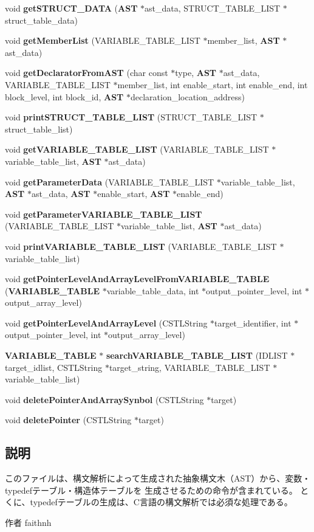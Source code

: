 \begin{DoxyCompactItemize}
void {\bf getSTRUCT\_\-DATA} ({\bf AST} $\ast$ast\_\-data, STRUCT\_\-TABLE\_\-LIST $\ast$struct\_\-table\_\-data)
\item 
void {\bf getMemberList} (VARIABLE\_\-TABLE\_\-LIST $\ast$member\_\-list, {\bf AST} $\ast$ast\_\-data)
\item 
void {\bf getDeclaratorFromAST} (char const $\ast$type, {\bf AST} $\ast$ast\_\-data, VARIABLE\_\-TABLE\_\-LIST $\ast$member\_\-list, int enable\_\-start, int enable\_\-end, int block\_\-level, int block\_\-id, {\bf AST} $\ast$declaration\_\-location\_\-address)
\item 
void {\bf printSTRUCT\_\-TABLE\_\-LIST} (STRUCT\_\-TABLE\_\-LIST $\ast$struct\_\-table\_\-list)
\item 
void {\bf getVARIABLE\_\-TABLE\_\-LIST} (VARIABLE\_\-TABLE\_\-LIST $\ast$variable\_\-table\_\-list, {\bf AST} $\ast$ast\_\-data)
\item 
void {\bf getParameterData} (VARIABLE\_\-TABLE\_\-LIST $\ast$variable\_\-table\_\-list, {\bf AST} $\ast$ast\_\-data, {\bf AST} $\ast$enable\_\-start, {\bf AST} $\ast$enable\_\-end)
\item 
void {\bf getParameterVARIABLE\_\-TABLE\_\-LIST} (VARIABLE\_\-TABLE\_\-LIST $\ast$variable\_\-table\_\-list, {\bf AST} $\ast$ast\_\-data)
\item 
void {\bf printVARIABLE\_\-TABLE\_\-LIST} (VARIABLE\_\-TABLE\_\-LIST $\ast$variable\_\-table\_\-list)
\item 
void {\bf getPointerLevelAndArrayLevelFromVARIABLE\_\-TABLE} ({\bf VARIABLE\_\-TABLE} $\ast$variable\_\-table\_\-data, int $\ast$output\_\-pointer\_\-level, int $\ast$output\_\-array\_\-level)
\item 
void {\bf getPointerLevelAndArrayLevel} (CSTLString $\ast$target\_\-identifier, int $\ast$output\_\-pointer\_\-level, int $\ast$output\_\-array\_\-level)
\item 
{\bf VARIABLE\_\-TABLE} $\ast$ {\bf searchVARIABLE\_\-TABLE\_\-LIST} (IDLIST $\ast$target\_\-idlist, CSTLString $\ast$target\_\-string, VARIABLE\_\-TABLE\_\-LIST $\ast$variable\_\-table\_\-list)
\item 
void {\bf deletePointerAndArraySynbol} (CSTLString $\ast$target)
\item 
void {\bf deletePointer} (CSTLString $\ast$target)
\end{DoxyCompactItemize}


\subsection{説明}
このファイルは、構文解析によって生成された抽象構文木（AST）から、変数・typedefテーブル・構造体テーブルを 生成させるための命令が含まれている。 とくに、typedefテーブルの生成は、C言語の構文解析では必須な処理である。 \begin{DoxyAuthor}{作者}
faithnh 
\end{DoxyAuthor}



